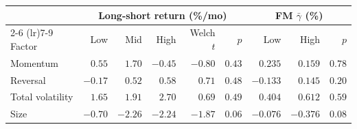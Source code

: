 \begin{tabular}{lrrrrrrrr}
\toprule
& \multicolumn{5}{c}{Long-short return (\%/mo)} & \multicolumn{3}{c}{FM $\bar\gamma$ (\%)} \\
\cmidrule(lr){2-6} \cmidrule(lr){7-9}
Factor & Low & Mid & High & Welch $t$ & $p$ & Low & High & $p$ \\
\midrule
Momentum & $0.55$ & $1.70$ & $-0.45$ & $-0.80$ & $0.43$ & $0.235$ & $0.159$ & $0.78$ \\
Reversal & $-0.17$ & $0.52$ & $0.58$ & $0.71$ & $0.48$ & $-0.133$ & $0.145$ & $0.20$ \\
Total volatility & $1.65$ & $1.91$ & $2.70$ & $0.69$ & $0.49$ & $0.404$ & $0.612$ & $0.59$ \\
Size & $-0.70$ & $-2.26$ & $-2.24$ & $-1.87$ & $0.06$ & $-0.076$ & $-0.376$ & $0.08$ \\
\bottomrule
\end{tabular}
